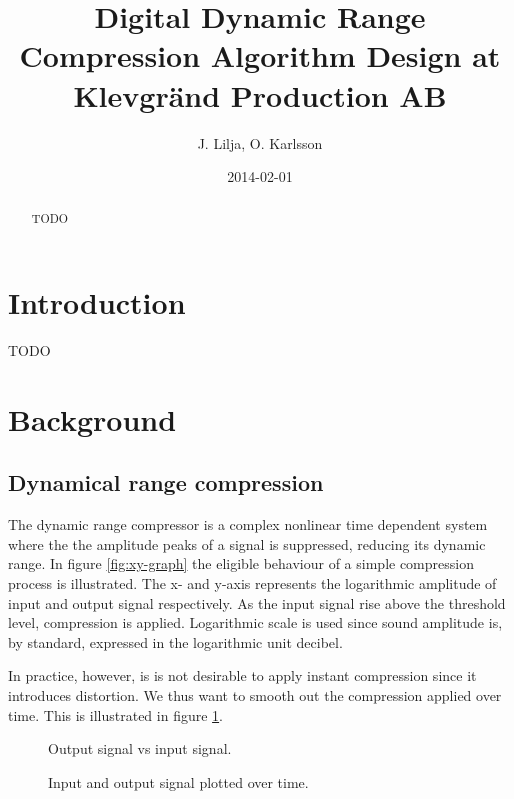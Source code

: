 \documentclass[]{article}
\begin{document}
\title{Digital Dynamic Range Compression Algorithm Design at Klevgränd Production AB}
\author{J. Lilja, O. Karlsson}
\date{2014-02-01}
\maketitle

\begin{abstract}
TODO
\end{abstract}

\clearpage
\section{Introduction}
TODO
\section{Background}
\subsection{Dynamical range compression}
The dynamic range compressor is a complex nonlinear time dependent system where the the amplitude peaks of a signal is suppressed, reducing its dynamic range. In figure \ref{fig:xy-graph} the eligible behaviour of a simple compression process is illustrated. The x- and y-axis represents the logarithmic amplitude of input and output signal respectively. As the input signal rise above the threshold level, compression is applied. Logarithmic scale is used since sound amplitude is, by standard, expressed in the logarithmic unit decibel.

In practice, however, is is not desirable to apply instant compression since it introduces distortion\cite{giannoullis}. We thus want to smooth out the compression applied over time. This is illustrated in figure \ref{fig:envelope-graph}.

\begin{figure}[ht]
\captionsetup{justification=centering}
\begin{minipage}[t]{.5\textwidth}
 \centering

\caption{Output signal vs input signal.} 
\label{fig:xy-graph}
\end{minipage}%
\begin{minipage}[t]{.5\textwidth}
\centering

\caption{Input and output signal plotted over time. } 
\label{fig:envelope-graph}
\end{minipage}
\end{figure}
\end{document}
